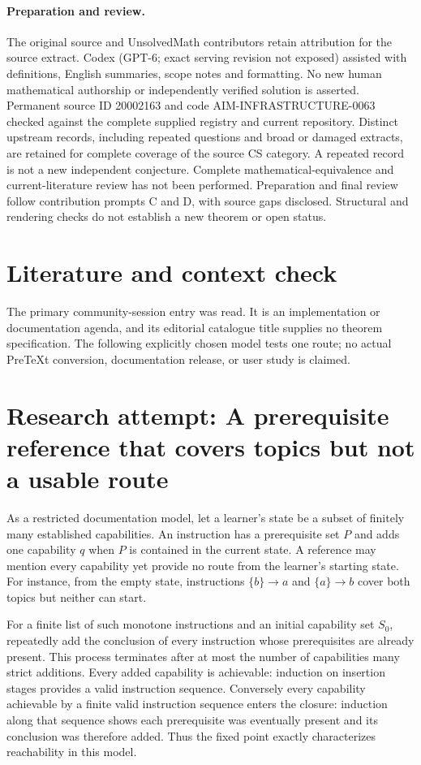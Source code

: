\documentclass[11pt]{article}
\begin{document}
\paragraph{Preparation and review.}
The original source and UnsolvedMath contributors retain attribution for the source extract. Codex (GPT-6; exact serving revision not exposed) assisted with definitions, English summaries, scope notes and formatting. No new human mathematical authorship or independently verified solution is asserted. Permanent source ID 20002163 and code AIM-INFRASTRUCTURE-0063 checked against the complete supplied registry and current repository. Distinct upstream records, including repeated questions and broad or damaged extracts, are retained for complete coverage of the source CS category. A repeated record is not a new independent conjecture. Complete mathematical-equivalence and current-literature review has not been performed. Preparation and final review follow contribution prompts C and D, with source gaps disclosed. Structural and rendering checks do not establish a new theorem or open status.
\label{end:20002163}

\section{Literature and context check}
The primary community-session entry was read. It is an implementation or documentation agenda, and its editorial catalogue title supplies no theorem specification. The following explicitly chosen model tests one route; no actual PreTeXt conversion, documentation release, or user study is claimed.
\section{Research attempt: A prerequisite reference that covers topics but not a usable route}
As a restricted documentation model, let a learner's state be a subset of finitely many established capabilities. An instruction has a prerequisite set $P$ and adds one capability $q$ when $P$ is contained in the current state. A reference may mention every capability yet provide no route from the learner's starting state. For instance, from the empty state, instructions $\{b\}\to a$ and $\{a\}\to b$ cover both topics but neither can start.

For a finite list of such monotone instructions and an initial capability set $S_0$, repeatedly add the conclusion of every instruction whose prerequisites are already present. This process terminates after at most the number of capabilities many strict additions. Every added capability is achievable: induction on insertion stages provides a valid instruction sequence. Conversely every capability achievable by a finite valid instruction sequence enters the closure: induction along that sequence shows each prerequisite was eventually present and its conclusion was therefore added. Thus the fixed point exactly characterizes reachability in this model.
\end{document}
